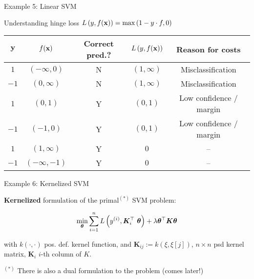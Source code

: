 \documentclass[11pt,compress,t,notes=noshow, xcolor=table]{beamer}
\begin{document}
\begin{framei}[fs=footnotesize]{Example 5: Linear SVM}
\item Understanding hinge loss $L\left(y, f(\mathbf{x})\right) = \max\left(1 - y\cdot f, 0\right)$
\item[] \begin{tabular}{ c | c | c | c | c }
$\mathbf{y}$ & $f(\mathbf{x})$ &  \textbf{Correct pred.?}  & $L\left(y, f(\mathbf{x})\right)$ & \textbf{Reason for costs}  \\ \hline
 $1$ & $(- \infty, 0)$  & N & $(1, \infty)$ & Misclassification \\
 $- 1$ & $(0, \infty)$ & N  & $(1, \infty)$ &  Misclassification \\
 $1$ & $(0, 1)$ & Y & $(0, 1)$ & Low confidence / margin \\
 $- 1$ & $(-1, 0)$  & Y  & $(0, 1)$& Low confidence / margin\\
 $1$ & $(1, \infty)$ &  Y & $0$ & -- \\
 $- 1$ & $(- \infty, -1)$ &  Y & $0$ & -- \\
\end{tabular}
\vfill
\splitV
{
}
{
}
\end{framei}

\begin{framei}{Example 6: Kernelized SVM}
\item \textbf{Kernelized} formulation of the primal$^{(*)}$ SVM problem:
\item[] $$ \min_{\bm{\theta}}\sum\limits_{i=1}^n L\left(y^{(i)}, \bm{K}_i^\top ~\bm{\theta}\right) + \lambda \bm{\theta}^\top \bm{K} \bm{\theta} $$
\item with $k(\cdot, \cdot)$ pos. def. kernel function, and $\bm{K}_{ij} := k(\xi, \xi[j])$, $n \times n$ psd kernel matrix, $\bm{K}_i$ $i$-th column of $K$.
\vfill
{}
{
}
\item[] $^{(*)}$ There is also a dual formulation to the problem (comes later!)
\end{framei}
\end{document}
